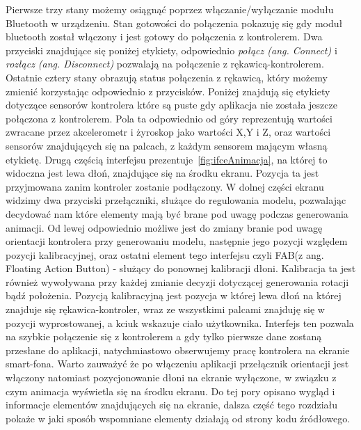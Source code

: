 Pierwsze trzy stany możemy osiągnąć poprzez włączanie/wyłączanie modułu Bluetooth w urządzeniu. Stan gotowości do połączenia pokazuję się gdy moduł bluetooth został włączony i jest gotowy do połączenia z kontrolerem. Dwa przyciski znajdujące się poniżej etykiety, odpowiednio \textit{połącz (ang. Connect)} i \textit{rozłącz (ang. Disconnect)} pozwalają na połączenie z rękawicą-kontrolerem. Ostatnie cztery stany obrazują status połączenia z rękawicą, który możemy zmienić korzystając odpowiednio z przycisków. Poniżej znajdują się etykiety dotyczące sensorów kontrolera które są puste gdy aplikacja nie została jeszcze połączona z kontrolerem. Pola ta odpowiednio od góry reprezentują wartości zwracane przez akcelerometr i żyroskop jako wartości X,Y i Z, oraz wartości sensorów znajdujących się na palcach, z każdym sensorem mającym własną etykietę. Drugą częścią interfejsu prezentuje~\ref{fig:ifceAnimacja}, na której to widoczna jest lewa dłoń, znajdujące się na środku ekranu. Pozycja ta jest przyjmowana zanim kontroler zostanie podłączony. W dolnej części ekranu widzimy dwa przyciski przełączniki, służące do regulowania modelu, pozwalając decydować nam które elementy mają być brane pod uwagę podczas generowania animacji. Od lewej odpowiednio możliwe jest do zmiany branie pod uwagę orientacji kontrolera przy generowaniu modelu, następnie jego pozycji względem pozycji kalibracyjnej, oraz ostatni element tego interfejsu czyli FAB(z ang. Floating Action Button) - służący do ponownej kalibracji dłoni. Kalibracja ta jest również wywoływana przy każdej zmianie decyzji dotyczącej generowania rotacji bądź położenia. Pozycją kalibracyjną jest pozycja w której lewa dłoń na której znajduje się rękawica-kontroler, wraz ze wszystkimi palcami znajduję się w pozycji wyprostowanej, a kciuk wskazuje ciało użytkownika. Interfejs ten pozwala na szybkie połączenie się z kontrolerem a gdy tylko pierwsze dane zostaną przesłane do aplikacji, natychmiastowo obserwujemy pracę kontrolera na ekranie smart-fona. Warto zauważyć że po włączeniu aplikacji przełącznik orientacji jest włączony natomiast pozycjonowanie dłoni na ekranie wyłączone, w związku z czym animacja wyświetla się na środku ekranu. Do tej pory opisano wygląd i informacje elementów znajdujących się na ekranie, dalsza część tego rozdziału pokaże w jaki sposób wspomniane elementy działają od strony kodu źródłowego.

